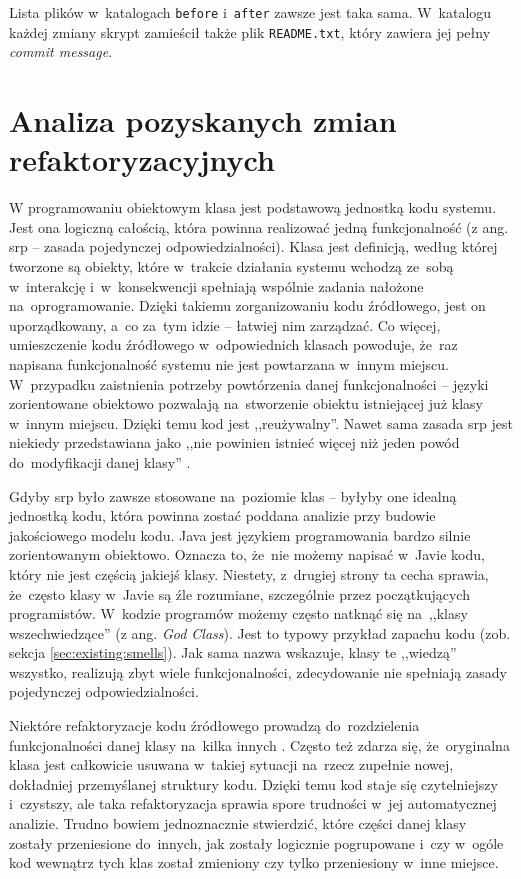 \documentclass[twoside]{praca}
\begin{document}
Lista plików w~katalogach \texttt{before} i~\texttt{after} zawsze jest taka sama. W~katalogu każdej zmiany skrypt zamieścił także plik \texttt{README.txt}, który zawiera jej pełny \textit{commit message}.


\section{Analiza pozyskanych zmian refaktoryzacyjnych}
\label{sec:impl:analiza-klasy}

W programowaniu obiektowym klasa jest podstawową jednostką kodu systemu. Jest ona logiczną całością, która powinna realizować jedną funkcjonalność (z ang. \gls{srp} -- zasada pojedynczej odpowiedzialności). Klasa jest definicją, według której tworzone są obiekty, które w~trakcie działania systemu wchodzą ze~sobą w~interakcję i~w~konsekwencji spełniają wspólnie zadania nałożone na~oprogramowanie. Dzięki takiemu zorganizowaniu kodu źródłowego, jest on uporządkowany, a~co za~tym idzie -- łatwiej nim zarządzać. Co więcej, umieszczenie kodu źródłowego w~odpowiednich klasach powoduje, że~raz napisana funkcjonalność systemu nie jest powtarzana w~innym miejscu. W~przypadku zaistnienia potrzeby powtórzenia danej funkcjonalności -- języki zorientowane obiektowo pozwalają na~stworzenie obiektu istniejącej już klasy w~innym miejscu. Dzięki temu kod jest ,,reużywalny''. Nawet sama zasada \gls{srp} jest niekiedy przedstawiana jako ,,nie powinien istnieć więcej niż jeden powód do~modyfikacji danej klasy'' \cite{martin2002single}.

Gdyby \gls{srp} było zawsze stosowane na~poziomie klas -- byłyby one idealną jednostką kodu, która powinna zostać poddana analizie przy budowie jakościowego modelu kodu. Java jest językiem programowania bardzo silnie zorientowanym obiektowo. Oznacza to, że~nie możemy napisać w~Javie kodu, który nie jest częścią jakiejś klasy. Niestety, z~drugiej strony ta cecha sprawia, że~często klasy w~Javie są źle rozumiane, szczególnie przez początkujących programistów. W~kodzie programów możemy często natknąć się na~,,klasy wszechwiedzące'' \cite{martin2009clean} (z ang. \textit{God Class}). Jest to typowy przykład zapachu kodu (zob. sekcja \ref{sec:existing:smells}). Jak sama nazwa wskazuje, klasy te ,,wiedzą'' wszystko, realizują zbyt wiele funkcjonalności, zdecydowanie nie spełniają zasady pojedynczej odpowiedzialności. 

Niektóre refaktoryzacje kodu źródłowego prowadzą do~rozdzielenia funkcjonalności danej klasy na~kilka innych \cite{drozdz}. Często też zdarza się, że~oryginalna klasa jest całkowicie usuwana w~takiej sytuacji na~rzecz zupełnie nowej, dokładniej przemyślanej struktury kodu. Dzięki temu kod staje się czytelniejszy i~czystszy, ale taka refaktoryzacja sprawia spore trudności w~jej automatycznej analizie. Trudno bowiem jednoznacznie stwierdzić, które części danej klasy zostały przeniesione do~innych, jak zostały logicznie pogrupowane i~czy w~ogóle kod wewnątrz tych klas został zmieniony czy tylko przeniesiony w~inne miejsce.
\end{document}
